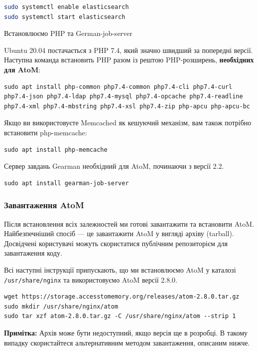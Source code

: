 \documentclass[14pt,a4paper]{article}
\begin{document}
\begin{large}
\begin{lstlisting}[language=bash]
sudo systemctl enable elasticsearch
sudo systemctl start elasticsearch
\end{lstlisting}

Встановлюємо PHP та German-job-server

Ubuntu 20.04 постачається з PHP 7.4, який значно швидший за попередні версії. Наступна команда встановить PHP разом із рештою PHP-розширень, \textbf{необхідних для AtoM}:


\begin{lstlisting}
sudo apt install php-common php7.4-common php7.4-cli php7.4-curl php7.4-json php7.4-ldap php7.4-mysql php7.4-opcache php7.4-readline php7.4-xml php7.4-mbstring php7.4-xsl php7.4-zip php-apcu php-apcu-bc
\end{lstlisting}

Якщо ви використовуєте Memcached як кешуючий механізм, вам також потрібно встановити php-memcache:

\begin{lstlisting}
sudo apt install php-memcache
\end{lstlisting}

Сервер завдань Gearman необхідний для AtoM, починаючи з версії 2.2.

\begin{lstlisting}
sudo apt install gearman-job-server
\end{lstlisting}


\subsubsection{Завантаження AtoM}
Після встановлення всіх залежностей ми готові завантажити та встановити AtoM. Найбезпечніший спосіб — це завантажити AtoM у вигляді архіву (tarball). Досвідчені користувачі можуть скористатися публічним репозиторієм для завантаження коду.

Всі наступні інструкції припускають, що ми встановлюємо AtoM у каталозі \texttt{/usr/share/nginx} та використовуємо AtoM версії 2.8.0.

\begin{lstlisting}
wget https://storage.accesstomemory.org/releases/atom-2.8.0.tar.gz
sudo mkdir /usr/share/nginx/atom
sudo tar xzf atom-2.8.0.tar.gz -C /usr/share/nginx/atom --strip 1
\end{lstlisting}

\textbf{Примітка:} Архів може бути недоступний, якщо версія ще в розробці. В такому випадку скористайтеся альтернативним методом завантаження, описаним нижче.


\end{large}
\end{document}

